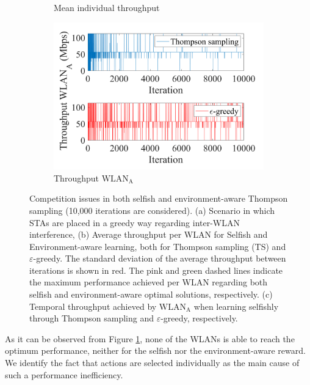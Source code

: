 \documentclass{article}
\begin{document}
\begin{figure}[h!!!!]
\begin{subfigure}[b]{0.48\textwidth}
		\caption{Mean individual throughput}
		\label{fig:4_grid_selfish_adversarial_mean_tpt}
	\end{subfigure}
	\begin{subfigure}[b]{0.36\textwidth}
		\includegraphics[width=\textwidth]{experiment_2_3_variability}
		\caption{Throughput $\text{WLAN}_\text{A}$}
		\label{fig:experiment_2_3_variability}
	\end{subfigure}
	\caption{Competition issues in both selfish and environment-aware Thompson sampling (10,000 iterations are considered). (a) Scenario in which STAs are placed in a greedy way regarding inter-WLAN interference, (b) Average throughput per WLAN for Selfish and Environment-aware learning, both for Thompson sampling (TS) and $\varepsilon$-greedy. The standard deviation of the average throughput between iterations is shown in red. The pink and green dashed lines indicate the maximum performance achieved per WLAN regarding both selfish and environment-aware optimal solutions, respectively. (c) Temporal throughput achieved by $\text{WLAN}_\text{A}$ when learning selfishly through Thompson sampling and $\varepsilon$-greedy, respectively.}
	\label{fig:4_grid_selfish_adversarial}
\end{figure}

As it can be observed from Figure \ref{fig:4_grid_selfish_adversarial_mean_tpt}, none of the WLANs is able to reach the optimum performance, neither for the selfish nor the environment-aware reward. We identify the fact that actions are selected individually as the main cause of such a performance inefficiency. 
\end{document}
